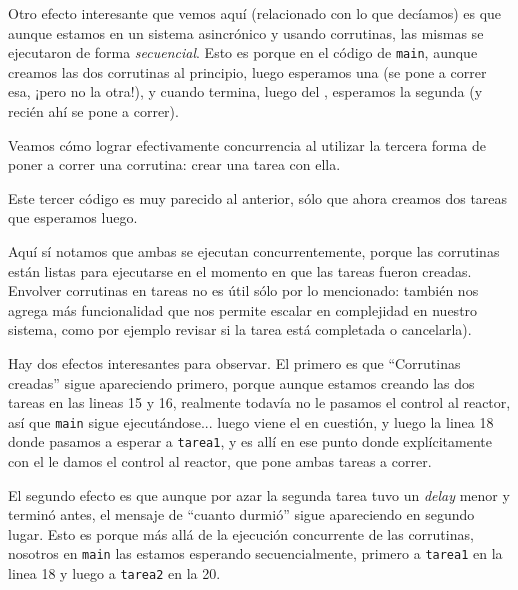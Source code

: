 Otro efecto interesante que vemos aquí (relacionado con lo que decíamos) es que aunque estamos en un sistema asincrónico y usando corrutinas, las mismas se ejecutaron de forma \textit{secuencial}. Esto es porque en el código de \texttt{main}, aunque creamos las dos corrutinas al principio, luego esperamos una (se pone a correr esa, ¡pero no la otra!), y cuando termina, luego del , esperamos la segunda (y recién ahí se pone a correr).

Veamos cómo lograr efectivamente concurrencia al utilizar la tercera forma de poner a correr una corrutina: crear una tarea con ella.


Este tercer código es muy parecido al anterior, sólo que ahora creamos dos tareas que esperamos luego.


Aquí sí notamos que ambas se ejecutan concurrentemente, porque las corrutinas están listas para ejecutarse en el momento en que las tareas fueron creadas. Envolver corrutinas en tareas no es útil sólo por lo mencionado: también nos agrega más funcionalidad que nos permite escalar en complejidad en nuestro sistema, como por ejemplo revisar si la tarea está completada o cancelarla).

Hay dos efectos interesantes para observar. El primero es que ``Corrutinas creadas'' sigue apareciendo primero, porque aunque estamos creando las dos tareas en las lineas 15 y 16, realmente todavía no le pasamos el control al reactor, así que \texttt{main} sigue ejecutándose... luego viene el  en cuestión, y luego la linea 18 donde pasamos a esperar a \texttt{tarea1}, y es allí en ese punto donde explícitamente con el  le damos el control al reactor, que pone ambas tareas a correr.

El segundo efecto es que aunque por azar la segunda tarea tuvo un \textit{delay} menor y terminó antes, el mensaje de ``cuanto durmió'' sigue apareciendo en segundo lugar. Esto es porque más allá de la ejecución concurrente de las corrutinas, nosotros en \texttt{main} las estamos esperando secuencialmente, primero a \texttt{tarea1} en la linea 18 y luego a \texttt{tarea2} en la 20.

